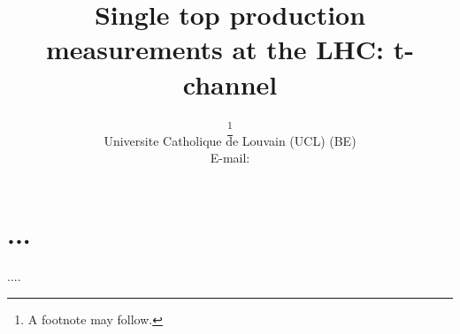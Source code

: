 \documentclass{PoS}
\title{Single top production measurements at the LHC: t-channel}
\author{\speaker{Matthias Komm}%
         \thanks{A footnote may follow.}\\
        Universite Catholique de Louvain (UCL) (BE)\\
        E-mail: \email{Matthias.Komm@cern.ch}}
\begin{document}
\section{...}


\begin{thebibliography}{99}
   ....
\end{thebibliography}
\end{document}
